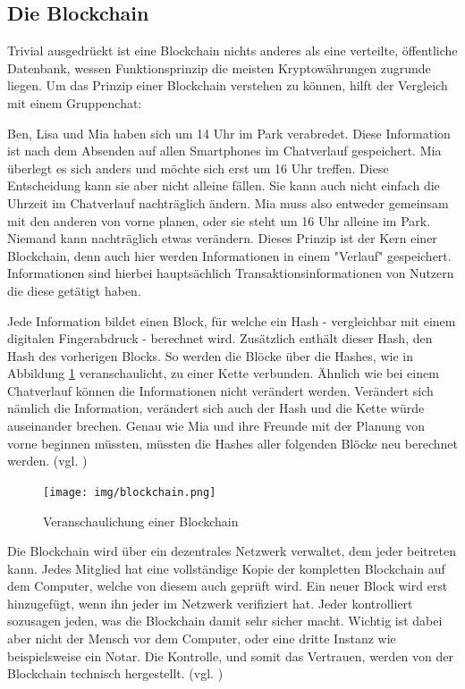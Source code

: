 \documentclass[oneside]{ausarbeitung}
\begin{document}
\subsection{Die Blockchain}
\label{sub:blockchain}

Trivial ausgedrückt ist eine Blockchain nichts anderes als eine verteilte, öffentliche Datenbank\cite{blockchain_definition}, wessen Funktionsprinzip die meisten Kryptowährungen zugrunde liegen\cite{blockchain_1}.
Um das Prinzip einer Blockchain verstehen zu können, hilft der Vergleich mit einem Gruppenchat:

Ben, Lisa und Mia haben sich um 14 Uhr im Park verabredet. Diese Information ist nach dem Absenden auf allen Smartphones im Chatverlauf gespeichert. Mia überlegt es sich anders und möchte sich erst um 16 Uhr treffen. Diese Entscheidung kann sie aber nicht alleine fällen. Sie kann auch nicht einfach die Uhrzeit im Chatverlauf nachträglich ändern. Mia muss also entweder gemeinsam mit den anderen von vorne planen, oder sie steht um 16 Uhr alleine im Park. Niemand kann nachträglich etwas verändern. Dieses Prinzip ist der Kern einer Blockchain, denn auch hier werden Informationen in einem "Verlauf" gespeichert. Informationen sind hierbei hauptsächlich Transaktionsinformationen von Nutzern die diese getätigt haben.

Jede Information bildet einen Block, für welche ein Hash - vergleichbar mit einem digitalen Fingerabdruck - berechnet wird. Zusätzlich enthält dieser Hash, den Hash des vorherigen Blocks. So werden die Blöcke über die Hashes, wie in Abbildung \ref{fig:4} veranschaulicht, zu einer Kette verbunden. Ähnlich wie bei einem Chatverlauf können die Informationen nicht verändert werden. Verändert sich nämlich die Information, verändert sich auch der Hash und die Kette würde auseinander brechen. Genau wie Mia und ihre Freunde mit der Planung von vorne beginnen müssten, müssten die Hashes aller folgenden Blöcke neu berechnet werden. (vgl. \cite{blockchain})

\begin{figure}[H]
  \centering
  \texttt{[image: img/blockchain.png]}
  \caption{Veranschaulichung einer Blockchain\cite{blockchain}}
  \label{fig:4}
\end{figure} 

Die Blockchain wird über ein dezentrales Netzwerk verwaltet, dem jeder beitreten kann. Jedes Mitglied hat eine vollständige Kopie der kompletten Blockchain auf dem Computer, welche von diesem auch geprüft wird. Ein neuer Block wird erst hinzugefügt, wenn ihn jeder im Netzwerk verifiziert hat. Jeder kontrolliert sozusagen jeden, was die Blockchain damit sehr sicher macht. Wichtig ist dabei aber nicht der Mensch vor dem Computer, oder eine dritte Instanz wie beispielsweise ein Notar. Die Kontrolle, und somit das Vertrauen, werden von der Blockchain technisch hergestellt. (vgl. \cite{blockchain})
\end{document}

